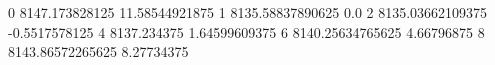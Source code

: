 0 8147.173828125 11.58544921875
1 8135.58837890625 0.0
2 8135.03662109375 -0.5517578125
4 8137.234375 1.64599609375
6 8140.25634765625 4.66796875
8 8143.86572265625 8.27734375
